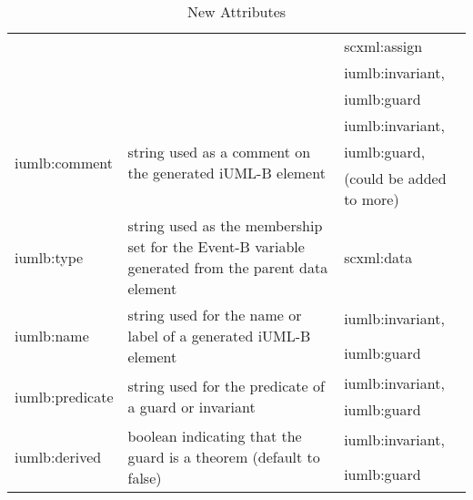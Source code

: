 \begin{table}[tbp]
{\begin{tabular}{|l|l|l|}
                                   &                                                                                                                            & scxml:assign             \\
                                   &                                                                                                                            & iumlb:invariant,         \\
                                   &                                                                                                                            & iumlb:guard              \\ \hline
\multirow{3}{*}{iumlb:comment}     & \multirow{3}{*}{string used as a comment on the generated iUML-B element}                                                  & iumlb:invariant,         \\
                                   &                                                                                                                            & iumlb:guard,             \\
                                   &                                                                                                                            & (could be added to more) \\ \hline
iumlb:type                         & string used as the membership set for the Event-B variable generated from the parent data element                          & scxml:data               \\ \hline
\multirow{2}{*}{iumlb:name}        & \multirow{2}{*}{string used for the name or label of a generated iUML-B element}                                           & iumlb:invariant,         \\
                                   &                                                                                                                            & iumlb:guard              \\ \hline
\multirow{2}{*}{iumlb:predicate}   & \multirow{2}{*}{string used for the predicate of a guard or invariant}                                                     & iumlb:invariant,         \\
                                   &                                                                                                                            & iumlb:guard              \\ \hline
\multirow{2}{*}{iumlb:derived}     & \multirow{2}{*}{boolean indicating that the guard is a theorem (default to false)}                                         & iumlb:invariant,         \\
                                   &                                                                                                                            & iumlb:guard              \\ \hline
\end{tabular}%
}
\caption{New Attributes}
\label{iumlb_attributes_table}
\end{table}

